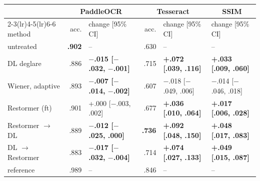 \begin{tabular}{lrlrll}
\toprule
 & \multicolumn{2}{c}{PaddleOCR} & \multicolumn{2}{c}{Tesseract} & \multicolumn{1}{c}{SSIM} \\
\cmidrule(lr){2-3}\cmidrule(lr){4-5}\cmidrule(lr){6-6}
method & acc. & change [95\% CI] & acc. & change [95\% CI] & change [95\% CI] \\
\midrule
untreated & \textbf{.902} & -- & .630 & -- & -- \\
DL deglare & .886 & \textbf{$-$.015 [$-$.032, $-$.001]} & .715 & \textbf{+.072 [.039, .116]} & \textbf{+.033 [.009, .060]} \\
Wiener, adaptive & .893 & \textbf{$-$.007 [$-$.014, $-$.002]} & .607 & $-$.018 [$-$.049, .006] & $-$.014 [$-$.046, .018] \\
Restormer (ft) & .901 & +.000 [$-$.003, .002] & .677 & \textbf{+.036 [.010, .064]} & \textbf{+.017 [.006, .028]} \\
Restormer $\rightarrow$ DL & .889 & \textbf{$-$.012 [$-$.025, .000]} & \textbf{.736} & \textbf{+.092 [.048, .150]} & \textbf{+.048 [.017, .083]} \\
DL $\rightarrow$ Restormer & .883 & \textbf{$-$.017 [$-$.032, $-$.004]} & .714 & \textbf{+.074 [.027, .133]} & \textbf{+.049 [.015, .087]} \\
\midrule
reference & .989 & -- & .846 & -- & -- \\
\bottomrule
\end{tabular}

